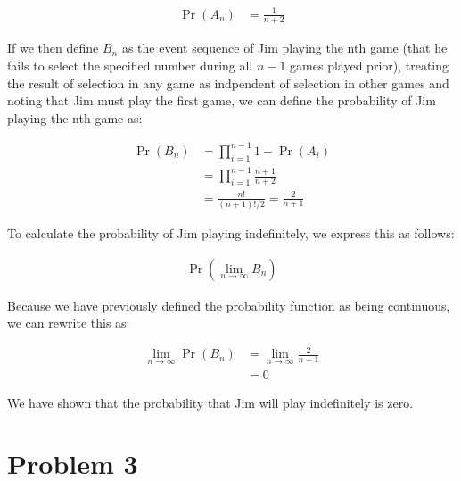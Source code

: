 \documentclass[11pt]{article}
\begin{document}
\begin{align*}
  \Pr(A_n) &= \frac{1}{n+2}
\end{align*}

If we then define $B_n$ as the event sequence of Jim playing the nth game (that he fails to select the specified number during all $n-1$ games played prior), treating the result of selection in any game as indpendent of selection in other games and noting that Jim must play the first game, we can define the probability of Jim playing the nth game as:

\begin{align*}
  \Pr(B_n) &= \prod_{i=1}^{n-1} 1 - \Pr(A_i)  \\
  &= \prod_{i=1}^{n-1} \frac{n+1}{n+2} \\
  &= \frac{n!}{(n+1)!/2} = \frac{2}{n+1}
\end{align*}

To calculate the probability of Jim playing indefinitely, we express this as follows:

\begin{align*}
  \Pr \left( \lim_{n \rightarrow \infty} B_n \right)
\end{align*}

Because we have previously defined the probability function as being continuous, we can rewrite this as:

\begin{align*}
  \lim_{n \rightarrow \infty} \Pr \left( B_n \right) &= \lim_{n \rightarrow \infty} \frac{2}{n+1} \\
  &= 0
\end{align*}

We have shown that the probability that Jim will play indefinitely is zero.

\section*{Problem 3}
\end{document}

